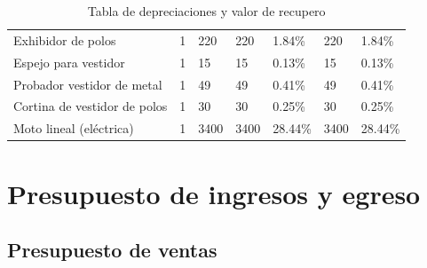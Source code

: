 \documentclass[a4paper,openright,12pt]{book}
\begin{document}
\begin{table}[H]
{\begin{tabular}{p{5cm}p{1.8cm}p{1.8cm}p{2.2cm}p{2.2cm}p{2.2cm}p{2.2cm}}
Exhibidor de polos            &     1             &     220                 &              220     & 1.84\%  &              220     & 1.84\%  \\
Espejo para vestidor          &     1             &     15                  &              15      & 0.13\%  &              15      & 0.13\% \\
Probador vestidor de metal    &     1             &     49                  &              49      & 0.41\%  &              49      & 0.41\% \\
Cortina de vestidor de polos  &     1             &     30                  &              30      & 0.25\%  &              30      & 0.25\%\\
Moto lineal (eléctrica)       &     1             &     3400                &              3400    & 28.44\% &              3400    & 28.44\% \\
\hline
\end{tabular}
}
\caption{Tabla de depreciaciones y valor de recupero}
\label{Tabla6}
\end{table}


\chapter{Presupuesto de ingresos y egreso}\label{cap.3}

\section{Presupuesto de ventas}
\end{document}
